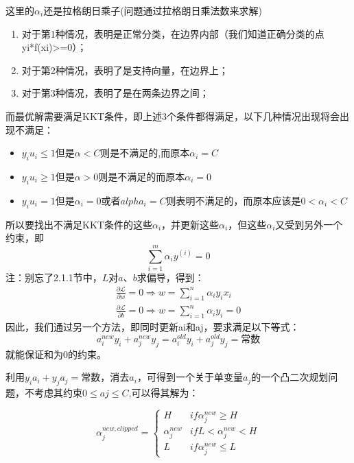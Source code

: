 \documentclass[a4paper,12pt]{article}
\begin{document}
这里的$\alpha_i$还是拉格朗日乘子(问题通过拉格朗日乘法数来求解)
\begin{enumerate}[1.~]
  \item 对于第1种情况，表明是正常分类，在边界内部（我们知道正确分类的点yi*f(xi)>=0）；
  \item 对于第2种情况，表明了是支持向量，在边界上；
  \item 对于第3种情况，表明了是在两条边界之间；
\end{enumerate}
而最优解需要满足KKT条件，即上述3个条件都得满足，以下几种情况出现将会出现不满足：
\begin{itemize}
  \item $y_iu_i\leq1$但是$\alpha<C$则是不满足的,而原本$\alpha_i=C$
  \item $y_iu_i\geq1$但是$\alpha>0$则是不满足的而原本$\alpha_i=0$
  \item $y_iu_i=1$但是$\alpha_i=0$或者$alpha_i=C$则表明不满足的，而原本应该是$0<\alpha_i<C$
\end{itemize}
所以要找出不满足KKT条件的这些$\alpha_i$，并更新这些$\alpha_i$，但这些$\alpha_i$又受到另外一个约束，即
\begin{equation}
  \sum_{i=1}^m \alpha _i y^{(i)}=0
\end{equation}
注：别忘了2.1.1节中，$L$对$a$、$b$求偏导，得到：
\begin{equation}
  \begin{split}
    \frac{\partial\mathcal{L}}{\partial w}=0 \Rightarrow w=\sum_{i=1}^n\alpha_iy_ix_i\\
    \frac{\partial\mathcal{L}}{\partial b}=0 \Rightarrow w=\sum_{i=1}^n\alpha_iy_i=0
  \end{split}
\end{equation}
因此，我们通过另一个方法，即同时更新ai和aj，要求满足以下等式：
\begin{equation}
  a_i^{new}y_i+a_j^{new}y_j= a_i^{old}y_i+a_j^{old}y_j=\text{常数}
\end{equation}
就能保证和为$0$的约束。

利用$y_ia_i+y_ja_j=\text{常数}$，消去$a_i$，可得到一个关于单变量$a_j$的一个凸二次规划问题，不考虑其约束$0\leq aj\leq C$,可以得其解为：

\begin{equation}
  \alpha_j^{new,clipped}=\left\{\begin{array}{ll}
      H & if \alpha_j^{new}\geq H\\
      \alpha_j^{new} & if L<\alpha_j^{new}<H\\
      L & if \alpha_j^{new}\leq L
  \end{array}\right.
\end{equation}
\end{document}

